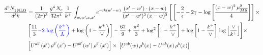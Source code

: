 \documentclass[9pt]{article}
\numberwithin{equation}{section}
\begin{document}
\begin{align}
     \frac{d^{3}N_{1\,\rm NLO}^{\rm}}{d^{3}k} &  = \frac{1}{(2\pi)^{3}}\, \frac{g^{4}\,N_{c}}{32\pi^{4}}\,\frac{1}{k^{+}}\, \int_{w, w',x,x'} e^{-ik(w^\prime-w)}\, \frac{(x'-w')\cdot (x-w)}{(x'-w')^{2}\, (x-w)^{2}}\, \Bigg[\left[-\frac{2}{\epsilon}-2\gamma-\log{\left[\frac{(x-w)^{2}\,\mu^{2}_{\overline{MS}}}{4}\right]}\right]\times \notag \\ & \left[\frac{11}{3}{\color{blue}-2\,\log{\left(\frac{k^{+}}{\Lambda}\right)}}+\log{\left(1-\frac{k^{+}}{\vee}\right)}\right]-\frac{67}{9}+\frac{\pi^{2}}{3}+\log^{2}{\left[1-\frac{k^{+}}{\vee}\right]}+\log{\left[1-\frac{k^{+}}{\vee}\right]}\,\log{\left[\frac{\vee}{k^{+}}\right]}\Bigg]\times\notag \\ & \left[U^{ab'}(x')\,\rho^{b'}(x') - U^{ab'}(w')\,\rho^{b'}(x')\right]\times\,\left[U^{ab}(w)\,\rho^{b}(x) - U^{ab}(x)\,\rho^{b}(x)\right]
\end{align}
\end{document}
